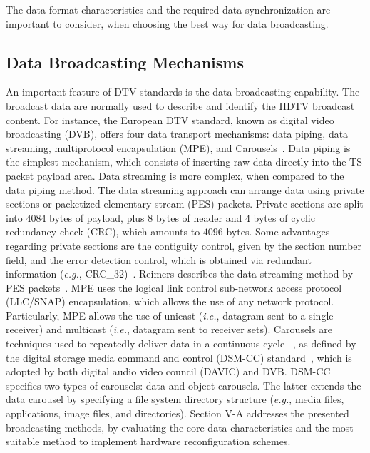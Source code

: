 The data format characteristics and the required data synchronization are important to consider, when choosing the best way for data broadcasting.

\subsection{Data Broadcasting Mechanisms}
\label{data-broadcasting}

An important feature of DTV standards is the data broadcasting capability. The broadcast data are normally used to describe and identify the HDTV broadcast content. For instance, the European DTV standard, known as digital video broadcasting (DVB), offers four data transport mechanisms: data piping, data streaming, multiprotocol encapsulation (MPE), and Carousels~\cite{ref20,ref21}. Data piping is the simplest mechanism, which consists of inserting raw data directly into the TS packet payload area. Data streaming is more complex, when compared to the data piping method. The data streaming approach can arrange data using private sections or packetized elementary stream (PES) packets. Private sections are split into $4084$ bytes of payload, plus $8$ bytes of header and $4$ bytes of cyclic redundancy check (CRC), which amounts to $4096$ bytes. Some advantages regarding private sections are the contiguity control, given by the section number field, and the error detection control, which is obtained via redundant information ({\em e.g.}, CRC\_32)~\cite{ref22}. Reimers describes the data streaming method by PES packets~\cite{ref23}. MPE uses the logical link control sub-network access protocol (LLC/SNAP) encapsulation, which allows the use of any network protocol. Particularly, MPE allows the use of unicast ({\em i.e.}, datagram sent to a single receiver) and multicast ({\em i.e.}, datagram sent to receiver sets). Carousels are techniques used to repeatedly deliver data in a continuous cycle ~\cite{ref24,ref25}, as defined by the digital storage media command and control (DSM-CC) standard~\cite{ref26}, which is adopted by both digital audio video council (DAVIC) and DVB. DSM-CC specifies two types of carousels: data and object carousels. The latter extends the data carousel by specifying a file system directory structure ({\em e.g.}, media files, applications, image files, and directories). Section V-A addresses the presented broadcasting methods, by evaluating the core data characteristics and the most suitable method to implement hardware reconfiguration schemes.

